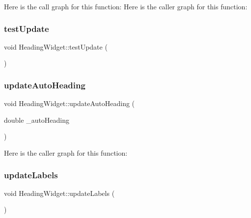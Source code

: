 Here is the call graph for this function\+:
Here is the caller graph for this function\+:
\mbox{\label{class_heading_widget_a78bb0235f0f713e6d15367e257ec4957}} 
\subsubsection{\texorpdfstring{test\+Update}{testUpdate}}
{\footnotesize\ttfamily void Heading\+Widget\+::test\+Update (\begin{DoxyParamCaption}{ }\end{DoxyParamCaption})\hspace{0.3cm}{\ttfamily [slot]}}

\mbox{\label{class_heading_widget_aa83d96e53fc9087d61faa7ee9e812b16}} 
\subsubsection{\texorpdfstring{update\+Auto\+Heading}{updateAutoHeading}}
{\footnotesize\ttfamily void Heading\+Widget\+::update\+Auto\+Heading (\begin{DoxyParamCaption}\item[{double}]{\+\_\+auto\+Heading }\end{DoxyParamCaption})\hspace{0.3cm}{\ttfamily [slot]}}

Here is the caller graph for this function\+:
\mbox{\label{class_heading_widget_a5970ad0efbbc29f3f1cc4222af237090}} 
\subsubsection{\texorpdfstring{update\+Labels}{updateLabels}}
{\footnotesize\ttfamily void Heading\+Widget\+::update\+Labels (\begin{DoxyParamCaption}{ }\end{DoxyParamCaption})\hspace{0.3cm}{\ttfamily [slot]}}

